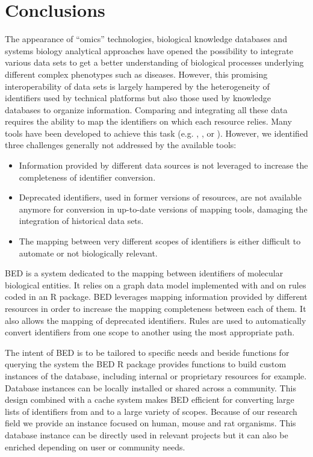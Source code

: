 \documentclass[9pt,a4paper,]{extarticle}
\theoremstyle{definition}
\theoremstyle{definition}
\theoremstyle{definition}
\theoremstyle{remark}
\begin{document}
\section{Conclusions}\label{conclusions}

The appearance of ``omics'' technologies, biological knowledge databases and
systems biology analytical approaches have opened the possibility to
integrate various data sets to get a better understanding of
biological processes underlying different complex phenotypes
such as diseases.
However, this promising interoperability of data sets is largely hampered
by the heterogeneity of identifiers used by technical platforms but also
those used by knowledge databases to organize information.
Comparing and integrating all these data
requires the ability to map the identifiers on which each resource relies.
Many tools have been developed to achieve this task
(e.g. \citet{kinsella_ensembl_2011}, \citet{wu_biogps_2013}, \citet{reimand_g:profiler-web_2016}
or \citet{van_iersel_bridgedb_2010}).
However, we identified three challenges generally not addressed by the
available tools:

\begin{itemize}
\item
  Information provided by different data sources is not leveraged to increase
  the completeness of identifier conversion.
\item
  Deprecated identifiers, used in former versions of resources, are not
  available anymore for conversion in up-to-date versions of mapping tools,
  damaging the integration of historical data sets.
\item
  The mapping between very different scopes of identifiers is either
  difficult to automate or not biologically relevant.
\end{itemize}

BED is a system dedicated to the mapping between identifiers of molecular
biological entities. It relies on a graph data model implemented with
\neo{} and on rules coded in an R package.
BED leverages mapping information provided by different resources in order
to increase the mapping completeness between each of them.
It also allows the mapping of deprecated identifiers.
Rules are used to automatically convert identifiers from one scope to another
using the most appropriate path.

The intent of BED is to be tailored to specific needs and
beside functions for querying the system the BED R package provides functions
to build custom instances of the database, including internal
or proprietary resources for example.
Database instances can be locally installed or shared across a community.
This design combined with a cache system makes BED efficient for converting
large lists of identifiers from and to a large variety of scopes.
Because of our research field we provide an instance focused on human,
mouse and rat organisms. This database instance can be directly used
in relevant projects but it can also be enriched depending on user or
community needs.
\end{document}
